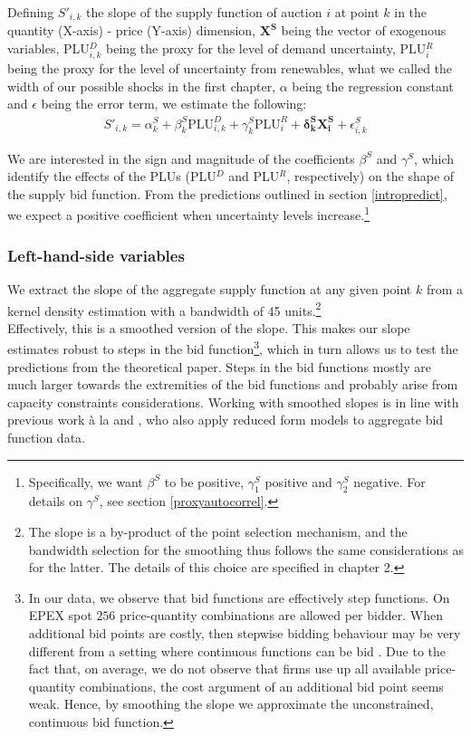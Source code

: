 Defining $S'_{i,k}$ the slope of the supply function of auction $i$ at point $k$ in the quantity (X-axis) - price (Y-axis) dimension, $\boldsymbol{X^S}$ being the vector of exogenous variables, PLU$^D_{i,k}$ being the proxy for the level of demand uncertainty, PLU$^R_i$ being the proxy for the level of uncertainty from renewables, what we called the width of our possible shocks in the first chapter, $\alpha$ being the regression constant and $\epsilon$ being the error term, we estimate the following:
\begin{eqnarray}
\label{secondstagereg2}
S'_{i,k} =\alpha_{k}^S+ \beta_{k}^S \text{PLU}^D_{i,k} + \gamma_{k}^S \text{PLU}^R_{i} + \boldsymbol{\delta_{k}^S X^S_i}+\epsilon_{i,k}^S
\end{eqnarray}

We are interested in the sign and magnitude of the coefficients $\beta^S$ and $\gamma^S$, which identify the effects of the PLUs (PLU$^D$ and PLU$^R$, respectively) on the shape of the supply bid function. From the predictions outlined in section \ref{intropredict}, we expect a positive coefficient when uncertainty levels increase.\footnote{Specifically, we want $\beta^S$ to be positive, $\gamma^S_1$ positive and $\gamma^S_2$ negative. For details on $\gamma^S$, see section \ref{proxyautocorrel}.}\\ 

\subsubsection{Left-hand-side variables}
\label{LHS}
We extract the slope of the aggregate supply function at any given point $k$ from a kernel density estimation with a bandwidth of 45 units.\footnote{The slope is a by-product of the point selection mechanism, and the bandwidth selection for the smoothing thus follows the same considerations as for the latter. The details of this choice are specified in chapter 2.}  \\

Effectively, this is a smoothed version of the slope. This makes our slope estimates robust to steps in the bid function\footnote{In our data, we observe that bid functions are effectively step functions. On EPEX spot $256$ price-quantity combinations are allowed per bidder. When additional bid points are costly, then stepwise bidding behaviour may be very different from a setting where continuous functions can be bid \cite{kastl2011discrete}. Due to the fact that, on average, we do not observe that firms use up all available price-quantity combinations, the cost argument of an additional bid point seems weak. Hence, by smoothing the slope we approximate the unconstrained, continuous bid function. }, which in turn allows us to test the predictions from the theoretical paper. Steps in the bid functions mostly are much larger towards the extremities of the bid functions and probably arise from capacity constraints considerations. Working with smoothed slopes is in line with previous work \`{a} la \cite{pw2002etude} and \cite{ozcan2004logistic}, who also apply reduced form models to aggregate bid function data. 

